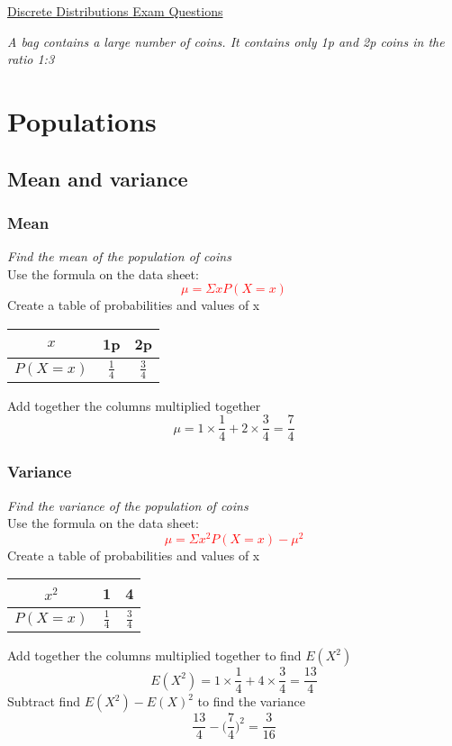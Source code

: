 \documentclass{article}[18pt]
\begin{document}
\begin{center}
\underline{\huge Discrete Distributions Exam Questions}
\end{center}
\textit{A bag contains a large number of coins. It contains only 1p and 2p coins in the ratio 1:3}
\section{Populations}
\subsection{Mean and variance}
\subsubsection{Mean}
\textit{Find the mean of the population of coins}\\
Use the formula on the data sheet:
\textcolor{red}{$$\mu=\Sigma xP(X=x)$$}
Create a table of probabilities and values of x
\begin{center}
{\renewcommand{\arraystretch}{1.5}
\begin{tabular}{|c|c|c|}
\hline
$x$&1p&2p\\
\hline
$P(X=x)$&$\frac{1}{4}$&$\frac{3}{4}$\\
\hline
\end{tabular}}
\end{center}
Add together the columns multiplied together
$$\mu=1\times\frac{1}{4}+2\times\frac{3}{4}=\frac{7}{4}$$
\subsubsection{Variance}
\textit{Find the variance of the population of coins}\\
Use the formula on the data sheet:
\textcolor{red}{$$\mu=\Sigma x^2P(X=x)-\mu^2$$}
Create a table of probabilities and values of x
\begin{center}
{\renewcommand{\arraystretch}{1.5}
\begin{tabular}{|c|c|c|}
\hline
$x^2$&1&4\\
\hline
$P(X=x)$&$\frac{1}{4}$&$\frac{3}{4}$\\
\hline
\end{tabular}}
\end{center}
Add together the columns multiplied together to find $E(X^2)$
$$E(X^2)=1\times\frac{1}{4}+4\times\frac{3}{4}=\frac{13}{4}$$
Subtract find $E(X^2)-E(X)^2$ to find the variance
$$\frac{13}{4}-\Bigg(\frac{7}{4}\Bigg)^2=\frac{3}{16}$$
\newpage
\end{document}
